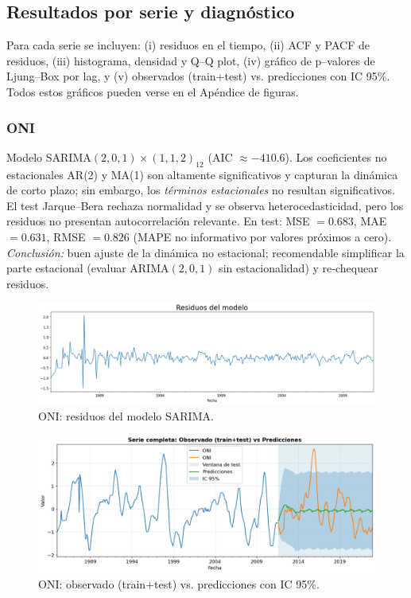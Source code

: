 \subsection{Resultados por serie y diagnóstico}
Para cada serie se incluyen: (i) residuos en el tiempo, (ii) ACF y PACF de residuos,
(iii) histograma, densidad y Q–Q plot, (iv) gráfico de p--valores de Ljung--Box por lag,
y (v) observados (train+test) vs. predicciones con IC 95\%. Todos estos gráficos pueden verse en el Apéndice de figuras. 

\subsubsection{ONI} 
Modelo SARIMA$(2,0,1)\times(1,1,2)_{12}$ (AIC $\approx -410.6$). 
Los coeficientes no estacionales AR(2) y MA(1) son altamente significativos y capturan la
dinámica de corto plazo; sin embargo, los \emph{términos estacionales} no resultan
significativos. El test Jarque--Bera rechaza normalidad y se observa heterocedasticidad,
pero los residuos no presentan autocorrelación relevante. En test: 
MSE $=0.683$, MAE $=0.631$, RMSE $=0.826$ (MAPE no informativo por valores próximos a cero).
\emph{Conclusión:} buen ajuste de la dinámica no estacional; recomendable
simplificar la parte estacional (evaluar ARIMA$(2,0,1)$ sin estacionalidad) y re‐chequear
residuos.
\vspace{0.3em}

\begin{figure}[H]\centering
\includegraphics[scale=.30]{Figures/res_sarima_oni.png}
\caption{ONI: residuos del modelo SARIMA.}
\label{fig:res_oni}
\end{figure}

\begin{figure}[H]\centering
\includegraphics[scale=.42]{Figures/pred_oni.png}
\caption{ONI: observado (train+test) vs. predicciones con IC 95\%.}
\label{fig:pred_oni}
\end{figure}


